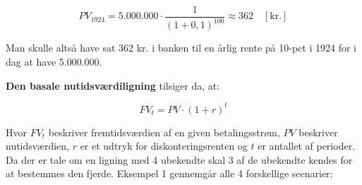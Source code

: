 \documentclass[10pt,reqno, usenames]{article}
\begin{document}
\begin{equation*}
    PV_{1924} = 5.000.000 \cdot \frac{1}{(1+0,1)^{100}} \approx 362 \quad [\text{kr.}]
\end{equation*}

Man skulle altså have sat 362 kr. i banken til en årlig rente på 10-pct i 1924 for i dag at have 5.000.000. 

\vspace{10 pt}

\textbf{Den basale nutidsværdiligning} tilsiger da, at: 

\begin{equation}
    FV_t = PV \cdot (1+r)^t
\end{equation}

Hvor $FV_t$ beskriver fremtidsværdien af en given betalingsstrøm, $PV$ beskriver nutidsværdien, $r$ er et udtryk for diskonteringsrenten og $t$ er antallet af perioder. Da der er tale om en ligning med 4 ubekendte skal 3 af de ubekendte kendes for at bestemmes den fjerde. Eksempel 1 gennemgår alle 4 forskellige scenarier: 
\end{document}
